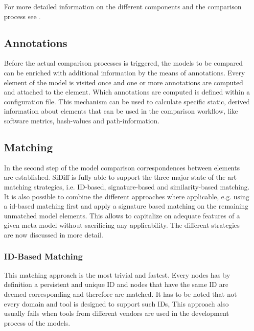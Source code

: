 \documentclass{article}
\begin{document}
For more detailed information on the different components and the comparison process see \cite{Kel05DiffAlg, Tre07DiffComp, Weh04SiDiff}.

\subsection{Annotations}
\label{secannotations}

Before the actual comparison processes is triggered, the models to be compared can be enriched with additional 
information by the means of annotations. Every element of the model is visited once and one or more annotations are computed and attached 
to the element. Which annotations are computed is defined within a configuration file. This mechanism can be used to calculate 
specific static, derived information about elements that can be used in the comparison workflow, like software metrics, hash-values and 
path-information.


\subsection{Matching}
\label{secmatching}
 
In the second step of the model comparison correspondences between elements are established. 
SiDiff is fully able to support the three major state of the art matching strategies, 
i.e. ID-based, signature-based and similarity-based matching. It is also possible to combine the different approaches where 
applicable, e.g. using a id-based matching first and apply a signature based matching on 
the remaining unmatched model elements. This allows to capitalize on adequate features of a given meta model 
without sacrificing any applicability. The different strategies are now discussed in more detail.    

\subsubsection{ID-Based Matching} 
This matching approach is the most trivial and fastest. Every nodes has by definition a persistent and unique ID and 
nodes that have the same ID are deemed corresponding and therefore are matched. It has to be noted that not every 
domain and tool is designed to support such IDs, This approach also usually fails when tools from different vendors 
are used in the development process of the models.    
\end{document}
